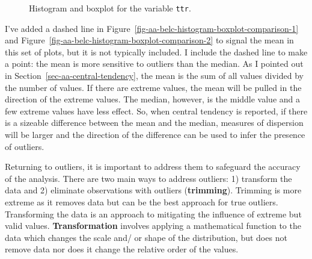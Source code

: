 \documentclass[
  letterpaper,
  DIV=11,
  numbers=noendperiod]{scrreport}
\theoremstyle{definition}
\theoremstyle{remark}
\begin{document}
\begin{figure}

\begin{minipage}[t]{\linewidth}

{\centering 


}

\end{minipage}%
\newline
\begin{minipage}[t]{\linewidth}

{\centering 


}

\end{minipage}%

\caption{\label{fig-aa-belc-histogram-boxplot-comparison}Histogram and
boxplot for the variable \texttt{ttr}.}

\end{figure}

I've added a dashed line in
Figure~\ref{fig-aa-belc-histogram-boxplot-comparison-1} and
Figure~\ref{fig-aa-belc-histogram-boxplot-comparison-2} to signal the
mean in this set of plots, but it is not typically included. I include
the dashed line to make a point: the mean is more sensitive to outliers
than the median. As I pointed out in
Section~\ref{sec-aa-central-tendency}, the mean is the sum of all values
divided by the number of values. If there are extreme values, the mean
will be pulled in the direction of the extreme values. The median,
however, is the middle value and a few extreme values have less effect.
So, when central tendency is reported, if there is a sizeable difference
between the mean and the median, measures of dispersion will be larger
and the direction of the difference can be used to infer the presence of
outliers.

Returning to outliers, it is important to address them to safeguard the
accuracy of the analysis. There are two main ways to address outliers:
1) transform the data and 2) eliminate observations with outliers
(\textbf{trimming}). Trimming is more extreme as it removes data but can
be the best approach for true outliers. Transforming the data is an
approach to mitigating the influence of extreme but valid values.
\textbf{Transformation} involves applying a mathematical function to the
data which changes the scale and/ or shape of the distribution, but does
not remove data nor does it change the relative order of the values.
\end{document}
